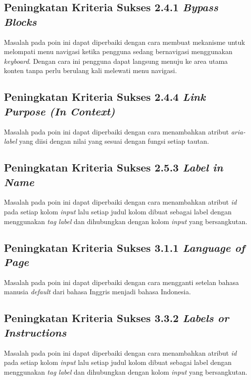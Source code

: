 \subsection{Peningkatan Kriteria Sukses 2.4.1 \textit{Bypass Blocks}}
\label{subsec:peningkatan_kriteria_sukses_2.4.1}
Masalah pada poin ini dapat diperbaiki dengan cara membuat mekanisme untuk melompati menu navigasi ketika pengguna sedang bernavigasi menggunakan \textit{keyboard}. Dengan cara ini pengguna dapat langsung menuju ke area utama konten tanpa perlu berulang kali melewati menu navigasi.

\subsection{Peningkatan Kriteria Sukses 2.4.4 \textit{Link Purpose (In Context)}}
\label{subsec:peningkatan_kriteria_sukses_2.4.4}
Masalah pada poin ini dapat diperbaiki dengan cara menambahkan atribut \textit{aria-label} yang diisi dengan nilai yang sesuai dengan fungsi setiap tautan.

\subsection{Peningkatan Kriteria Sukses 2.5.3 \textit{Label in Name}}
\label{subsec:peningkatan_kriteria_sukses_2.5.3}
Masalah pada poin ini dapat diperbaiki dengan cara menambahkan atribut \textit{id} pada setiap kolom \textit{input} lalu setiap judul kolom dibuat sebagai label dengan menggunakan \textit{tag label} dan dihubungkan dengan kolom \textit{input} yang bersangkutan.

\subsection{Peningkatan Kriteria Sukses 3.1.1 \textit{Language of Page}}
\label{subsec:peningkatan_kriteria_sukses_3.1.1}
Masalah pada poin ini dapat diperbaiki dengan cara mengganti setelan bahasa manusia \textit{default} dari bahasa Inggris menjadi bahasa Indonesia.

\subsection{Peningkatan Kriteria Sukses 3.3.2 \textit{Labels or Instructions}}
\label{subsec:peningkatan_kriteria_sukses_3.3.2}
Masalah pada poin ini dapat diperbaiki dengan cara menambahkan atribut \textit{id} pada setiap kolom \textit{input} lalu setiap judul kolom dibuat sebagai label dengan menggunakan \textit{tag label} dan dihubungkan dengan kolom \textit{input} yang bersangkutan.

